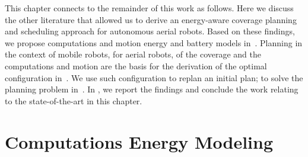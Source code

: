 This chapter connects to the remainder of this work as follows. Here we discuss the other literature that allowed us to derive an energy-aware coverage planning and scheduling approach for autonomous aerial robots. Based on these findings, we propose computations and motion energy and battery models in~. Planning in the context of mobile robots, for aerial robots, of the coverage and the computations and motion are the basis for the derivation of the optimal configuration in~. We use such configuration to replan an initial plan; to solve the planning problem in~. In , we report the findings and conclude the work relating to the state-of-the-art in this chapter.



\section{Computations Energy Modeling}
\label{sec:soa-ene-mod}

